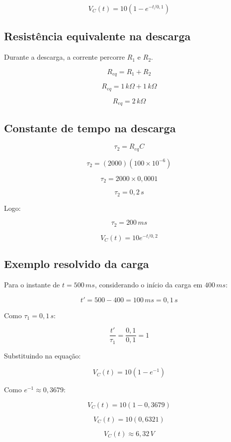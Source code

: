 \documentclass[12pt,a4paper]{article}
\begin{document}
\begin{calcbox}
\[
V_C(t)=10\left(1-e^{-t/0{,}1}\right)
\]
\end{calcbox}

\subsection{Resistência equivalente na descarga}

Durante a descarga, a corrente percorre $R_1$ e $R_2$.

\begin{calcbox}
\[
R_{eq}=R_1+R_2
\]

\[
R_{eq}=1\,k\Omega + 1\,k\Omega
\]

\[
R_{eq}=2\,k\Omega
\]
\end{calcbox}

\subsection{Constante de tempo na descarga}

\begin{calcbox}
\[
\tau_2 = R_{eq}C
\]

\[
\tau_2 = (2000)(100 \times 10^{-6})
\]

\[
\tau_2 = 2000 \times 0{,}0001
\]

\[
\tau_2 = 0{,}2\,s
\]

Logo:

\[
\tau_2 = 200\,ms
\]
\end{calcbox}

\begin{calcbox}
\[
V_C(t)=10e^{-t/0{,}2}
\]
\end{calcbox}

\newpage
\subsection{Exemplo resolvido da carga}

Para o instante de $t = 500\,ms$, considerando o início da carga em $400\,ms$:

\begin{calcbox}
\[
t' = 500 - 400 = 100\,ms = 0{,}1\,s
\]

Como $\tau_1 = 0{,}1\,s$:

\[
\frac{t'}{\tau_1} = \frac{0{,}1}{0{,}1}=1
\]

Substituindo na equação:

\[
V_C(t)=10(1-e^{-1})
\]

Como $e^{-1} \approx 0{,}3679$:

\[
V_C(t)=10(1-0{,}3679)
\]

\[
V_C(t)=10(0{,}6321)
\]

\[
V_C(t)\approx 6{,}32\,V
\]
\end{calcbox}
\end{document}

